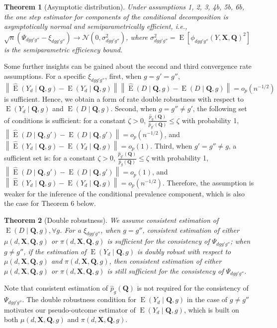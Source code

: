 \documentclass[12pt,a4paper]{article}
\newtheorem{prop}{Theorem}
\newcommand{\E}{\operatorname{E}}
\def\X{{\boldsymbol X}}
\def\Q{{\boldsymbol Q}}
\begin{document}
\begin{prop}[Asymptotic distribution]
Under assumptions 1, 2, 3, 4b, 5b, 6b, the one step estimator for components of the conditional decomposition is asymptotically normal and semiparametrically efficient, i.e., $\sqrt{n} \left( \Psi_{dgg'g''} - \xi_{dgg'g''} \right) \xrightarrow{} \mathcal{N}(0, \sigma^2_{dgg'g''})$, where $\sigma^2_{dgg'g''}=\E[\phi_{dgg'g''}(Y,\X,\Q)^2]$ is the semiparametric efficiency bound.
\end{prop}
Some further insights can be gained about the second and third convergence rate assumptions. For a specific $\xi_{dgg'g''}$, first, when $g=g'=g''$, $\left\| \hat{\E}\left( Y_d \mid \Q, g \right) - \E(Y_d \mid \Q,g)  \right\| \left\| \hat{\E}(D \mid \Q, g) - \E(D \mid \Q, g)  \right\| = o_p(n^{-1/2})$ is sufficient. Hence, we obtain a form of rate double robustness with respect to $\E(Y_d \mid \Q,g)$ and $\E(D \mid \Q, g)$. Second, when $g= g'' \neq g'$, the following set of conditions is sufficient: for a constant $\zeta>0$, $\frac{\hat{p}_g(\Q)}{\hat{p}_{g'}(\Q)} \leq \zeta$ with probability 1, $\left\| \hat{\E}(D \mid \Q, g') - \E(D \mid \Q, g') \right\|=o_p(n^{-1/2})$, and $ \left\| \hat{\E}\left( Y_d \mid \Q, g \right) - \E(Y_d \mid \Q,g) \right\|=o_p(1)$. Third, when $g'=g'' \neq g$, a sufficient set is: for a constant $\zeta>0$, $ \frac{\hat{p}_{g'}(\Q)}{\hat{p}_{g}(\Q)} \leq \zeta$ with probability 1, $\left\| \hat{\E}(D \mid \Q, g') - \E(D \mid \Q, g') \right\|=o_p(1)$, and $\left\| \hat{\E}\left( Y_d \mid \Q, g \right) - \E(Y_d \mid \Q,g)  \right\|=o_p(n^{-1/2})$. Therefore, the assumption is weaker for the inference of the conditional prevalence component, which is also the case for Theorem 6 below.

\begin{prop}[Double robustness]
We assume consistent estimation of $\E(D \mid \Q, g), \forall g$. For a $\xi_{dgg'g''}$, when $g=g''$, consistent estimation of either $\mu(d,\X,\Q,g)$ or $\pi(d,\X,\Q,g)$ is sufficient for the consistency of $\Psi_{dgg'g''}$; when $g \neq g''$, if the estimation of $\E(Y_d \mid \Q,g)$ is doubly robust with respect to $\mu(d,\X,\Q,g)$ and $\pi(d,\X,\Q,g)$, then consistent estimation of either $\mu(d,\X,\Q,g)$ or $\pi(d,\X,\Q,g)$ is still sufficient for the consistency of $\Psi_{dgg'g''}$.
\end{prop}
Note that consistent estimation of $\hat{p}_g(\Q)$ is not required for the consistency of $\Psi_{dgg'g''}$. The double robustness condition for $\E(Y_d \mid \Q,g)$ in the case of $g \neq g''$ motivates our pseudo-outcome estimator of $\E(Y_d \mid \Q,g)$, which is built on both $\mu(d,\X,\Q,g)$ and $\pi(d,\X,\Q,g)$.
\end{document}
